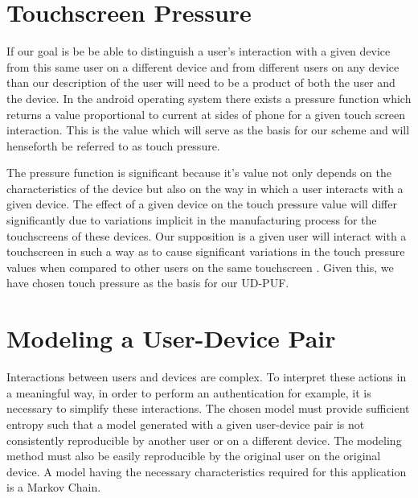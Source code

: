 \documentclass{acm_proc_article-sp}
\begin{document}
\section{Touchscreen Pressure}
\label{sec:touchscreen}
If our goal is be be able to distinguish a user's interaction with a given device from this same user on a different device and from different users on any device than our description of the user will need to be a product of both the user and the device. In the android operating system there exists a pressure function which returns a value proportional to current at sides of phone for a given touch screen interaction. \cite{zhu2013sensec} This is the value which will serve as the basis for our scheme and will henseforth be referred to as touch pressure. 

The pressure function is significant because it's value not only depends on the characteristics of the device but also on the way in which a user interacts with a given device. The effect of a given device on the touch pressure value will differ significantly due to variations implicit in the manufacturing process for the touchscreens of these devices. \cite{manufacturing_differences} Our supposition is a given user will interact with a touchscreen in such a way as to cause significant variations in the touch pressure values when compared to other users on the same touchscreen \cite{user_touchscreen_interations}.  Given this, we have chosen touch pressure as the basis for our UD-PUF.

\section{Modeling a User-Device Pair}
\label{sec:modeling}
Interactions between users and devices are complex. To interpret these actions in a meaningful way, in order to perform an authentication for example, it is necessary to simplify these interactions. The chosen model must provide sufficient entropy such that a model generated with a given user-device pair is not consistently reproducible by another user or on a different device. The modeling method must also be easily reproducible by the original user on the original device. A model having the necessary characteristics required for this application is a Markov Chain.
\end{document}
